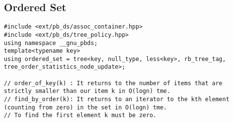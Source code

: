 \documentclass{article}
\begin{document}
\subsection{Ordered Set}
\begin{verbatim}
#include <ext/pb_ds/assoc_container.hpp>
#include <ext/pb_ds/tree_policy.hpp>
using namespace __gnu_pbds;
template<typename key>
using ordered_set = tree<key, null_type, less<key>, rb_tree_tag, tree_order_statistics_node_update>;

// order_of_key(k) : It returns to the number of items that are strictly smaller than our item k in O(logn) tme.
// find_by_order(k): It returns to an iterator to the kth element (counting from zero) in the set in O(logn) tme.
// To find the first element k must be zero.
\end{verbatim}
\end{document}
